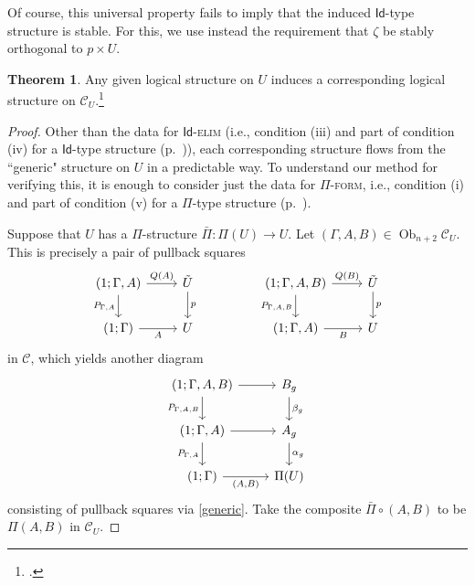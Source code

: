 \documentclass[10pt,letterpaper,cm]{nupset}
\theoremstyle{definition}
\theoremstyle{theorem}
\newtheorem{theorem}[definition]{Theorem}
\theoremstyle{remark}
\DeclareMathOperator{\ob}{Ob}
\newcommand{\id}{\mathsf{Id}}
\newcommand{\0}{\mathbf{0}}
\newcommand{\1}{\mathbf{1}}
\newcommand{\2}{\mathbf{2}}
\renewcommand{\c}{\mathscr{C}}
\begin{document}
Of course, this universal property fails to imply that the induced $\id$-type structure  is stable. For this, we use instead the requirement that $\zeta$ be stably orthogonal to $p \times U$.

\begin{theorem}\label{univlog}
Any given logical structure on $U$ induces a corresponding logical structure on $\c_U$.\footnote{\cite[Theorem 1.4.15]{KL}.}
\end{theorem}
\begin{proof}
Other than the data for $\id$-\textsc{elim} (i.e., condition (iii) and part of condition (iv) for a $\id$-type structure (p.~\pageref{idtype})), each corresponding structure flows from the ``generic" structure on $U$ in a predictable way. To understand our method for verifying this, it is enough to consider just the data for $\Pi$-\textsc{form}, i.e., condition (i) and part of condition (v) for a $\Pi$-type structure (p.~\pageref{pitype}).

\smallskip

Suppose that $U$ has a $\Pi$-structure $\bar{\Pi}: \Pi(U)\to U$. Let $\left(\Gamma, A, B\right)\in \ob_{n+2}{\c_U}$. This is precisely a pair of pullback squares
\[
\begin{tikzcd}
{\left(1; \Gamma, A\right)} \arrow[d, "{P_{\Gamma, A}}"'] \arrow[r, "Q(A)"] & \tilde{U} \arrow[d, "p"] &  & {\left(1; \Gamma, A, B\right)} \arrow[d, "{P_{\Gamma, A, B}}"'] \arrow[r, "Q(B)"] & \tilde{U} \arrow[d, "p"] \\
\left(1;\Gamma\right) \arrow[r, "A"']                                       & U                        &  & {\left(1; \Gamma, A\right)} \arrow[r, "B"']                                       & U                       
\end{tikzcd}
\] in $\c$, which yields another diagram
\[
\begin{tikzcd}
{\left(1; \Gamma, A, B\right)} \arrow[d, "{P_{\Gamma, A, B}}"'] \arrow[r] & B_g \arrow[d, "\beta_g"]  \\
{\left(1; \Gamma, A\right)} \arrow[r] \arrow[d, "{P_{\Gamma, A}}"']       & A_g \arrow[d, "\alpha_g"] \\
\left(1; \Gamma\right) \arrow[r, "{\left(A, B\right)}"']       & \Pi(U)                   
\end{tikzcd}
\]  consisting of pullback squares via \cref{generic}. Take the composite $\bar{\Pi} \circ \left(A, B\right)$ to be $\Pi(A,B)$ in $\c_U$. 

\smallskip


\end{proof}
\end{document}
